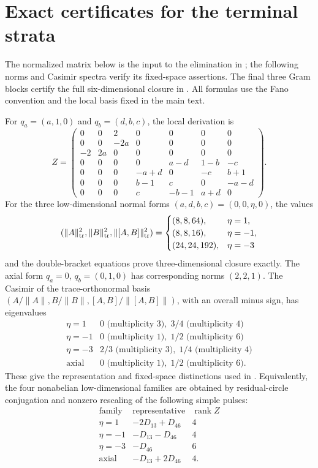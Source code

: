 \documentclass[11pt,a4paper]{article}
\begin{document}
\section{Exact certificates for the terminal strata}
\label{app:terminal-certificates}
The normalized matrix below is the input to the elimination in
; the following norms and Casimir spectra verify its
fixed-space assertions.  The final three Gram blocks certify the full
six-dimensional closure in .
All formulas use the Fano convention and the local basis fixed in the main text.

For $q_a=(a,1,0)$ and $q_b=(d,b,c)$, the local derivation is
\[
 Z=\begin{pmatrix}
 0&0&2&0&0&0&0\\
 0&0&-2a&0&0&0&0\\
 -2&2a&0&0&0&0&0\\
 0&0&0&0&a-d&1-b&-c\\
 0&0&0&-a+d&0&-c&b+1\\
 0&0&0&b-1&c&0&-a-d\\
 0&0&0&c&-b-1&a+d&0
 \end{pmatrix}.
\]
For the three low-dimensional normal forms $(a,d,b,c)=(0,0,\eta,0)$, the values
\[
 (\|A\|_{\rm tr}^2,\|B\|_{\rm tr}^2,\|[A,B]\|_{\rm tr}^2)
 =\begin{cases}(8,8,64),&\eta=1,\\(8,8,16),&\eta=-1,\\(24,24,192),&\eta=-3\end{cases}
\]
and the double-bracket equations prove three-dimensional closure exactly.  The axial form $q_a=0$, $q_b=(0,1,0)$ has corresponding norms $(2,2,1)$.  The Casimir of the trace-orthonormal basis $(A/\|A\|,B/\|B\|,[A,B]/\|[A,B]\|)$, with an overall minus sign, has eigenvalues
\[
\begin{array}{c|c}
\eta=1&0\text{ (multiplicity 3)},\;3/4\text{ (multiplicity 4)}\\
\eta=-1&0\text{ (multiplicity 1)},\;1/2\text{ (multiplicity 6)}\\
\eta=-3&2/3\text{ (multiplicity 3)},\;1/4\text{ (multiplicity 4)}\\
\text{axial}&0\text{ (multiplicity 1)},\;1/2\text{ (multiplicity 6)}.
\end{array}
\]
These give the representation and fixed-space distinctions used in .
Equivalently, the four nonabelian low-dimensional families are obtained by residual-circle conjugation and nonzero rescaling of the following simple pulses:
\[
\begin{array}{c|c|c}
\text{family}&\text{representative}&\operatorname{rank}Z\\\hline
\eta=1&-2D_{13}+D_{46}&4\\
\eta=-1&-D_{13}-D_{46}&4\\
\eta=-3&-D_{46}&6\\
\text{axial}&-D_{13}+2D_{46}&4.
\end{array}
\]
\end{document}
